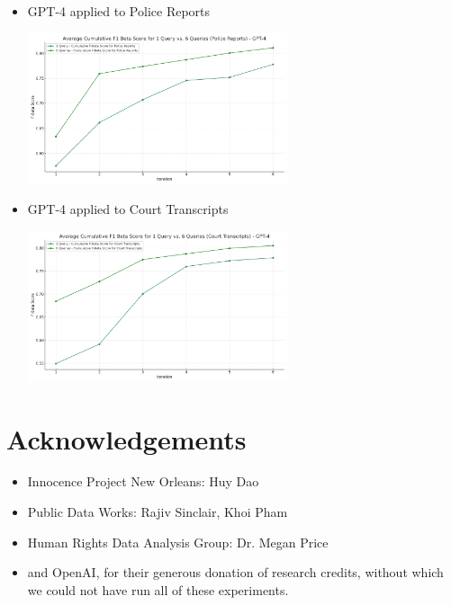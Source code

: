 \documentclass{article}
\begin{document}
\begin{itemize}
\item GPT-4 applied to Police Reports

\begin{center}
    \includegraphics[width=0.6\textwidth]{data/police_reports_graph_gpt-4.png}
\end{center}

\item GPT-4 applied to Court Transcripts

\begin{center}
    \includegraphics[width=0.6\textwidth]{data/court_transcripts_graph_gpt-4.png}
\end{center}

\end{itemize}

\section*{Acknowledgements}

\begin{itemize}
\item Innocence Project New Orleans: Huy Dao
\item Public Data Works: Rajiv Sinclair, Khoi Pham
\item Human Rights Data Analysis Group: Dr. Megan Price
\item and OpenAI, for their generous donation of research credits, without which we could not have run all of these experiments.
\end{itemize}
\end{document}
